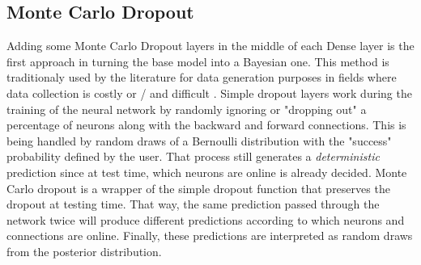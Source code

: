 \documentclass[11pt,twoside]{article}
\numberwithin{Theorem}{section}
\numberwithin{Definition}{section}
\numberwithin{Lemma}{section}
\numberwithin{Algorithm}{section}
\numberwithin{equation}{section}
\begin{document}
\subsection{Monte Carlo Dropout}
\label{sec:BNN}
Adding some Monte Carlo Dropout layers in the middle of each Dense layer is the first approach in turning the base model into a Bayesian one. This method is traditionaly used by the literature for data generation purposes in fields where data collection is costly or / and difficult \cite{miok2019generating}. Simple dropout layers work during the training of the neural network by randomly ignoring or "dropping out" a percentage of neurons along with the backward and forward connections. This is being handled by random draws of a Bernoulli distribution with the "success" probability defined by the user. That process still generates a \textit{deterministic} prediction since at test time, which neurons are online is already decided. Monte Carlo dropout is a wrapper of the simple dropout function that preserves the dropout at testing time. That way, the same prediction passed through the network twice will produce different predictions according to which neurons and connections are online. Finally, these predictions are interpreted as random draws from the posterior distribution.
\end{document}
